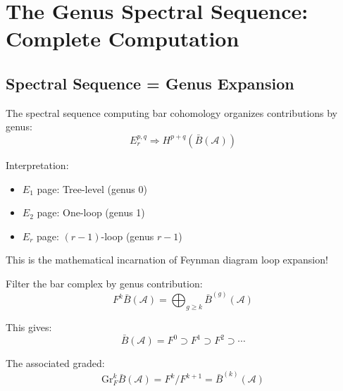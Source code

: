 \section{The Genus Spectral Sequence: Complete Computation}
\label{sec:genus-spectral-complete}

\subsection{Spectral Sequence = Genus Expansion}

\begin{principle}
\label{princ:ss-genus}
The spectral sequence computing bar cohomology organizes contributions by genus:
\begin{equation}
E_r^{p,q} \Rightarrow H^{p+q}(\bar{B}(\mathcal{A}))
\end{equation}

Interpretation:
\begin{itemize}
\item $E_1$ page: Tree-level (genus 0)
\item $E_2$ page: One-loop (genus 1)
\item $E_r$ page: $(r-1)$-loop (genus $r-1$)
\end{itemize}

This is the mathematical incarnation of Feynman diagram loop expansion!
\end{principle}

\begin{definition}
\label{def:genus-filtration-complete}
Filter the bar complex by genus contribution:
\begin{equation}
F^k \bar{B}(\mathcal{A}) = \bigoplus_{g \geq k} \bar{B}^{(g)}(\mathcal{A})
\end{equation}

This gives:
\begin{equation}
\bar{B}(\mathcal{A}) = F^0 \supset F^1 \supset F^2 \supset \cdots
\end{equation}

The associated graded:
\begin{equation}
\text{Gr}^k_F \bar{B}(\mathcal{A}) = F^k / F^{k+1} = \bar{B}^{(k)}(\mathcal{A})
\end{equation}
\end{definition}


